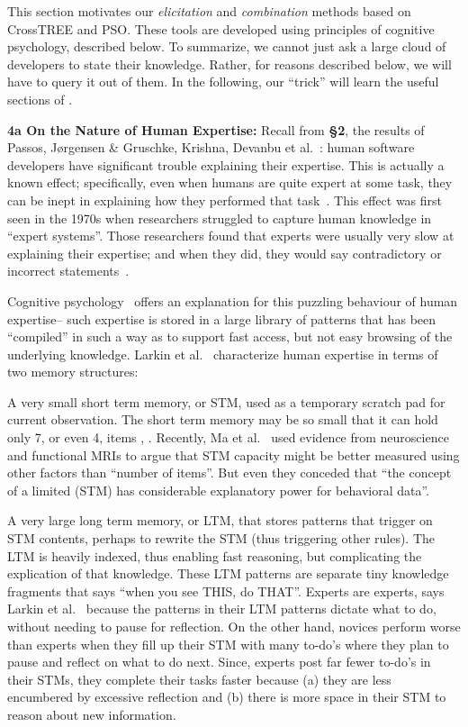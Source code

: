 This section motivates  our {\em elicitation} and {\em combination} methods
based on CrossTREE and PSO. These tools are developed using principles of cognitive
psychology,  described below. To summarize, we cannot just ask a large cloud of developers to state their knowledge. Rather, for reasons described below,
we will have to query it out of them. In the following, our ``trick'' will learn the useful sections of .

\noindent
{\bf 4a On the Nature of Human Expertise: }
Recall from {\bf \S{2}}, the results of  Passos, J\o rgensen \& Gruschke, Krishna, 
Devanbu et al.~\cite{Pa11,Jo09,De16,Me17,Kr16}: human software developers have significant trouble explaining
their expertise.  
This is actually
a  known effect; specifically, even 
when humans are quite expert at some task, they can be   inept in explaining how they performed that task~\cite{Fi80,menzies1987micro,menzies94,Compton1990}.  This effect was first seen in the 1970s when researchers struggled to capture  human knowledge in ``expert systems''.
Those researchers found that experts were usually very slow at explaining their expertise;  and when they did, they would say contradictory or incorrect statements~\cite{Fi80}.  

Cognitive psychology~\cite{La81} offers an explanation for this puzzling behaviour of human expertise-- such expertise is stored in a large library of patterns that has been ``compiled'' in such a way as to support fast access, but not
easy browsing of the underlying knowledge. 
Larkin et al.~\cite{La81} characterize human expertise in terms of two memory structures:
\bi
    \item A very small short term memory, or STM, used as a temporary scratch pad for current observation. The short term  memory may be so small that it can hold only 7,  or even 4, items \cite{Mi56}, \cite{Co01}. Recently,  Ma et al.~\cite{Ma14} used evidence from neuroscience and functional MRIs  to  argue  that STM capacity might be better measured using other factors than ``number of items''. But even they conceded that ``the concept of a limited (STM) has considerable explanatory power for behavioral data''.
    \item A very  large long term memory, or LTM, that stores patterns that trigger  on STM contents, perhaps to rewrite the STM  (thus triggering other rules).   The LTM is heavily  indexed, thus  enabling fast reasoning, but complicating the  explication of  that knowledge.  
These LTM patterns are separate tiny  knowledge fragments
that says ``when you see THIS, do THAT''.
\ei
Experts are experts, says Larkin et al.~\cite{La81} because the patterns in their  LTM
patterns dictate what to do, without needing to pause for reflection. On the other hand, novices perform worse than experts when they fill  up  their STM with many to-do's where they plan to pause and reflect on what to do next.  Since, experts post far fewer to-do's  in their STMs, they complete their tasks faster because (a) they are less encumbered by excessive reflection and (b) there is more space in their STM to reason about new information. 

